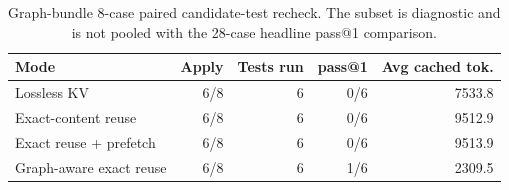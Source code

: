 \begin{table}[t]
\centering
\caption{Graph-bundle 8-case paired candidate-test recheck. The subset is diagnostic and is not pooled with the 28-case headline pass@1 comparison.}
\label{tab:graph-bundle-pass1}
\begin{tabular}{lrrrr}
\toprule
Mode & Apply & Tests run & pass@1 & Avg cached tok. \\
\midrule
Lossless KV & 6/8 & 6 & 0/6 & 7533.8 \\
Exact-content reuse & 6/8 & 6 & 0/6 & 9512.9 \\
Exact reuse + prefetch & 6/8 & 6 & 0/6 & 9513.9 \\
Graph-aware exact reuse & 6/8 & 6 & 1/6 & 2309.5 \\
\bottomrule
\end{tabular}
\end{table}
